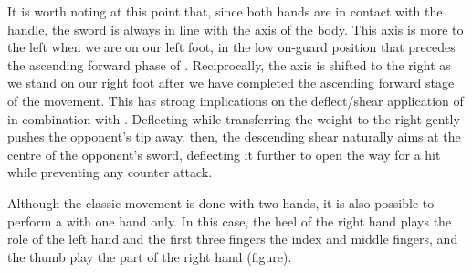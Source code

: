 It is worth noting at this point that, since both hands are in contact with the handle, the sword is always in line with the axis of the body. This axis is more to the left when we are on our left foot, in the low on-guard position that precedes the ascending forward phase of \Duo{}. Reciprocally, the axis is shifted to the right as we stand on our right foot after we have completed the ascending forward stage of the movement. This has strong implications on the deflect/shear application of  \Duo{} in combination with \Mo{}. Deflecting while transferring the weight to the right gently pushes the opponent's tip away, then, the descending shear naturally aims at the centre of the opponent's sword, deflecting it further to open the way for a hit while preventing any counter attack. 


Although the classic movement is done with two hands, it is also possible to perform a \Duo{} with one hand only. In this case, the heel of the right hand plays the role of the left hand and the first three fingers \textemdash{} the index and middle fingers, and the thumb \textemdash{} play the part of the right hand (figure). 

